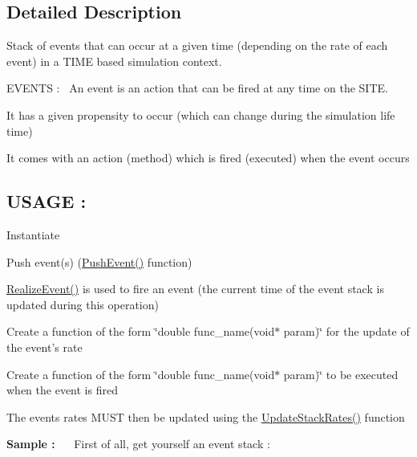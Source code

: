 \subsection{Detailed Description}
Stack of events that can occur at a given time (depending on the rate of each event) in a T\+I\+M\+E based simulation context.~\newline


E\+V\+E\+N\+T\+S \+:~\newline
 An event is an action that can be fired at any time on the S\+I\+T\+E.
\begin{DoxyItemize}
\item It has a given propensity to occur (which can change during the simulation life time)
\item It comes with an action (method) which is fired (executed) when the event occurs
\end{DoxyItemize}

\subsection*{U\+S\+A\+G\+E \+: }


\begin{DoxyItemize}
\item Instantiate
\item Push event(s) (\hyperlink{classelps_1_1_lab_event_stack_a0cf4b5b8bf78009aa20fc073f7ebfa6d}{Push\+Event()} function)
\item \hyperlink{classelps_1_1_lab_event_stack_a8335ecf33bf6210d5cb9c8d30a125f6e}{Realize\+Event()} is used to fire an event (the current time of the event stack is updated during this operation)
\begin{DoxyItemize}
\item Create a function of the form \char`\"{}double func\+\_\+name(void$\ast$ param)\char`\"{} for the update of the event's rate
\item Create a function of the form \char`\"{}double func\+\_\+name(void$\ast$ param)\char`\"{} to be executed when the event is fired
\end{DoxyItemize}
\item The events rates M\+U\+S\+T then be updated using the \hyperlink{classelps_1_1_lab_event_stack_a2c69343fc9e0218238c51004d854f900}{Update\+Stack\+Rates()} function
\end{DoxyItemize}

{\bfseries Sample \+:}~\newline
~\newline
 First of all, get yourself an event stack \+:


